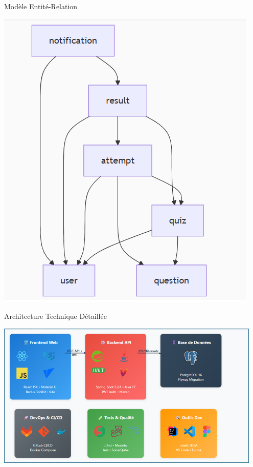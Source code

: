 \documentclass[aspectratio=169]{beamer}
\begin{document}
\begin{frame}{Modèle Entité-Relation}
    \begin{center}
        \includegraphics[width=\textwidth]{latex_media/media/Diagramme entite-relation.png}
    \end{center}
\end{frame}

\begin{frame}{Architecture Technique Détaillée}
    \begin{center}
        \includegraphics[width=0.95\textwidth]{latex_media/media/architecture_technique_systeme.png}
    \end{center}
\end{frame}
\end{document}
